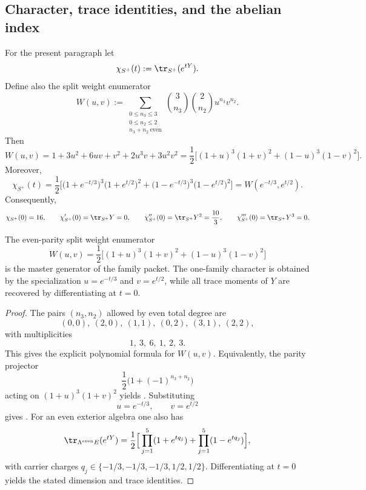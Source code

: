 \subsection{Character, trace identities, and the abelian index}

\begin{proposition}
\label{prop:split-weight-enumerator}
For the present paragraph let
\[
\chi_{S^+}(t):=\tr_{S^+}(e^{tY}).
\]
Define also the split weight enumerator
\[
W(u,v)
:=
\sum_{\substack{0\le n_3\le 3\\ 0\le n_2\le 2\\ n_3+n_2\ \mathrm{even}}}
\binom{3}{n_3}\binom{2}{n_2}u^{n_3}v^{n_2}.
\]
Then
\begin{equation}
\label{eq:split-weight-enumerator}
W(u,v)
=
1+3u^2+6uv+v^2+2u^3v+3u^2v^2
=
\frac12\Big[(1+u)^3(1+v)^2+(1-u)^3(1-v)^2\Big].
\end{equation}
Moreover,
\begin{equation}
\label{eq:family-character}
\chi_{S^+}(t)
=
\frac12\Big[
\bigl(1+e^{-t/3}\bigr)^3\bigl(1+e^{t/2}\bigr)^2
+
\bigl(1-e^{-t/3}\bigr)^3\bigl(1-e^{t/2}\bigr)^2
\Big]
=
W(e^{-t/3},e^{t/2}).
\end{equation}
Consequently,
\[
\chi_{S^+}(0)=16,
\qquad
\chi_{S^+}'(0)=\tr_{S^+}Y=0,
\qquad
\chi_{S^+}''(0)=\tr_{S^+}Y^2=\frac{10}{3},
\qquad
\chi_{S^+}'''(0)=\tr_{S^+}Y^3=0.
\]
\end{proposition}

\begin{remark}
The even-parity split weight enumerator
\[
W(u,v)=\frac12\bigl[(1+u)^3(1+v)^2+(1-u)^3(1-v)^2\bigr]
\]
is the master generator of the family packet. The one-family character is obtained by the
specialization $u=e^{-t/3}$ and $v=e^{t/2}$, while all trace moments of $Y$ are recovered by
differentiating at $t=0$.
\end{remark}

\begin{proof}
The pairs $(n_3,n_2)$ allowed by even total degree are
\[
(0,0),\ (2,0),\ (1,1),\ (0,2),\ (3,1),\ (2,2),
\]
with multiplicities
\[
1,\ 3,\ 6,\ 1,\ 2,\ 3.
\]
This gives the explicit polynomial formula for $W(u,v)$. Equivalently, the parity projector
\[
\frac12\bigl(1+(-1)^{n_3+n_2}\bigr)
\]
acting on $(1+u)^3(1+v)^2$ yields . Substituting
\[
u=e^{-t/3},
\qquad
v=e^{t/2}
\]
gives . For an even exterior algebra one also has
\[
\tr_{\Lambda^{\mathrm{even}}E}(e^{tY})
=
\frac12\Big[\prod_{j=1}^5(1+e^{tq_j})+\prod_{j=1}^5(1-e^{tq_j})\Big],
\]
with carrier charges $q_j\in\{-1/3,-1/3,-1/3,1/2,1/2\}$. Differentiating at $t=0$ yields the stated dimension and trace identities.
\end{proof}

